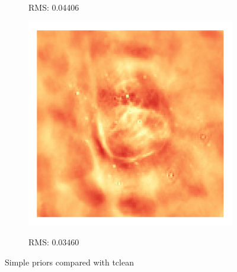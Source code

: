 \begin{figure}[h]
\begin{subfigure}[b]{0.3\linewidth}
		\begin{center}RMS: 0.04406\end{center}
	\end{subfigure}
	\begin{subfigure}[b]{0.3\linewidth}
		\includegraphics[width=\linewidth, trim={18px 19px 18px 18px}, clip]{./chapters/05.results/g55/L1_residual.png}
		\begin{center}RMS: 0.03460\end{center}
	\end{subfigure}
	\caption{Simple priors compared with tclean}
\end{figure}




